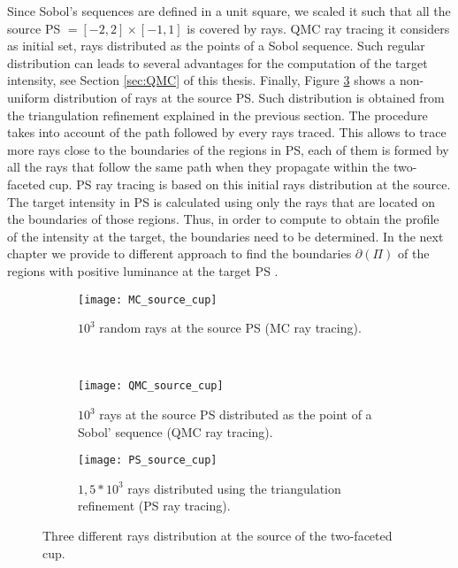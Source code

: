 Since Sobol's sequences are defined in a unit square, we scaled it such that all the source PS $=[-2, 2]\times[-1, 1]$ is covered by rays. QMC ray tracing it considers as initial set, rays distributed as the points of a Sobol sequence. Such regular distribution can leads to several advantages for the computation of the target intensity, see Section \ref{sec:QMC} of this thesis. Finally, Figure \ref{fig:ps_sample} shows a non-uniform distribution of rays at the source PS. Such distribution is obtained from the triangulation refinement explained in the previous section. The procedure takes into account of the path followed by every rays traced. This allows to trace more rays close to the boundaries of the regions in PS, each of them is formed by all the rays that follow the same path when they propagate within the two-faceted cup. PS ray tracing is based on this initial rays distribution at the source. The target intensity in PS is calculated using only the rays that are located on the boundaries of those regions. Thus, in order to compute to obtain the profile of the intensity at the target, the boundaries need to be determined. In the next chapter we provide to different approach to find the boundaries $\partial$$(\Pi)$ of the regions with positive luminance at the target PS .
\begin{figure}[h]
 \begin{subfigure}[t]{\textwidth}
\centering
    \texttt{[image: MC\_source\_cup]}
    \caption{$10^3$ random rays at the source PS (MC ray tracing).}
    \label{fig:mc_sample}
\end{subfigure}
\hfill
\\
\begin{subfigure}[t]{\textwidth}
\centering
    \texttt{[image: QMC\_source\_cup]}
    \caption{$10^3$ rays at the source PS distributed as the point of a Sobol' sequence (QMC ray tracing).}
    \label{fig:qmc_sample}
\end{subfigure}
\hfill
\begin{subfigure}[t]{\textwidth}
\centering
\texttt{[image: PS\_source\_cup]}
\caption{$1,5*10^3$ rays distributed using the triangulation refinement (PS ray tracing).}
\label{fig:ps_sample}
\end{subfigure}
\caption{Three different rays distribution at the source of the two-faceted cup.}
\label{fig:three_distributions}
\end{figure}

